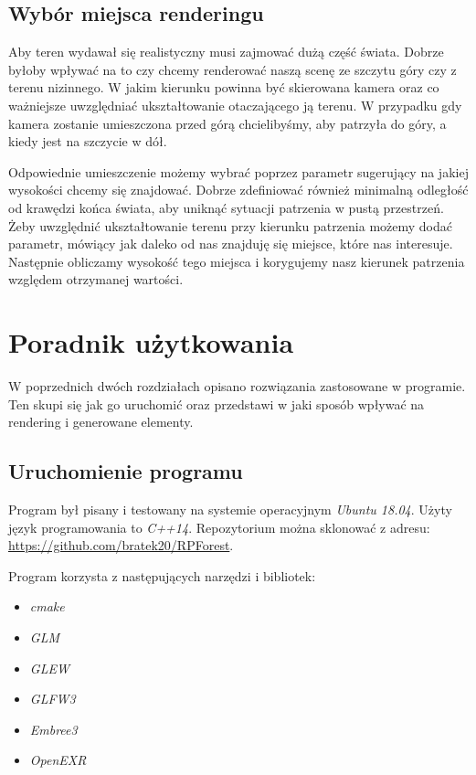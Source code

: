 \documentclass[inz,longabstract]{iithesis}
\begin{document}
    \section{Wybór miejsca renderingu}
        Aby teren wydawał się realistyczny musi zajmować dużą część świata. Dobrze byłoby wpływać na to czy chcemy renderować naszą scenę ze szczytu góry czy z terenu nizinnego. W jakim kierunku powinna być skierowana kamera oraz co ważniejsze uwzględniać ukształtowanie otaczającego ją terenu. W przypadku gdy kamera zostanie umieszczona przed górą chcielibyśmy, aby patrzyła do góry, a kiedy jest na szczycie w dół. 
        
        Odpowiednie umieszczenie możemy wybrać poprzez parametr sugerujący na jakiej wysokości chcemy się znajdować. Dobrze zdefiniować również minimalną odległość od krawędzi końca świata, aby uniknąć sytuacji patrzenia w pustą przestrzeń. Żeby uwzględnić ukształtowanie terenu przy kierunku patrzenia możemy dodać parametr, mówiący jak daleko od nas znajduję się miejsce, które nas interesuje. Następnie obliczamy wysokość tego miejsca i korygujemy nasz kierunek patrzenia względem otrzymanej wartości.
        
\chapter{Poradnik użytkowania}
    W poprzednich dwóch rozdziałach opisano rozwiązania zastosowane w programie. Ten skupi się jak go uruchomić oraz przedstawi w jaki sposób wpływać na rendering i generowane elementy.
    
    \section{Uruchomienie programu}
        Program był pisany i testowany na systemie operacyjnym \textit{Ubuntu 18.04}. Użyty język programowania to \textit{C++14}.
        Repozytorium można sklonować z adresu: \url{https://github.com/bratek20/RPForest}.
        
        Program korzysta z następujących narzędzi i bibliotek:
        \begin{itemize}
            \item \textit{cmake}
            \item \textit{GLM}
            \item \textit{GLEW}
            \item \textit{GLFW3}
            \item \textit{Embree3}
            \item \textit{OpenEXR}
        \end{itemize}
\end{document}
